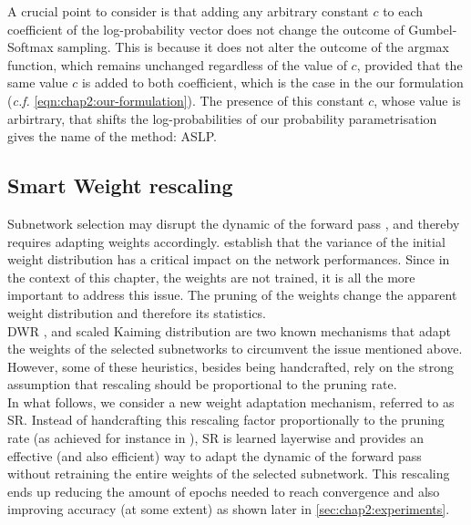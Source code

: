 A crucial point to consider is that adding any arbitrary constant $c$ to each
coefficient of the log-probability vector does not change the outcome of
Gumbel-Softmax sampling. This is because it does not alter the outcome of the
argmax function, which remains unchanged regardless of the value of $c$,
provided that the same value $c$ is added to both coefficient, which is the case
in the our formulation (\emph{c.f.} \cref{eqn:chap2:our-formulation}). The
presence of this constant $c$, whose value is arbirtrary, that shifts the
log-probabilities of our probability parametrisation gives the name of the
method: \acl{ASLP}.\\ 



\subsection{Smart Weight rescaling}
\label{sec:smart-rescale}
Subnetwork selection may disrupt the dynamic of the forward pass
\cite{DBLP:conf/iccv/HeZRS15,DBLP:conf/cvpr/RamanujanWKFR20}, and thereby
requires adapting  weights accordingly. \cite{DBLP:conf/iccv/HeZRS15} establish
that the variance of the initial weight distribution has a critical impact on
the network performances. Since in the context of this chapter, the weights are
not trained, it is all the more important to address this issue. The pruning of
the weights change the apparent weight distribution and therefore its
statistics.\\

\ac{DWR} \cite{DBLP:conf/nips/ZhouLLY19}, and scaled Kaiming distribution
\cite{DBLP:conf/cvpr/RamanujanWKFR20}  are two known mechanisms that adapt the
weights of the selected subnetworks to circumvent the issue mentioned above.
However, some of these heuristics, besides being handcrafted,   rely on the
strong assumption that rescaling should be proportional to the pruning rate.\\

In what follows,  we consider a new weight adaptation mechanism, referred to as
\ac{SR}. Instead of handcrafting this rescaling factor proportionally
to the pruning rate (as achieved for instance in
\cite{DBLP:conf/nips/ZhouLLY19}), \ac{SR} is learned layerwise and provides an
effective (and also efficient)  way to adapt the dynamic of the forward pass
without retraining the entire weights of the selected subnetwork. This
rescaling ends up reducing the amount of epochs needed to reach convergence and
also improving accuracy (at some extent) as shown later in \cref{sec:chap2:experiments}. \\ 

